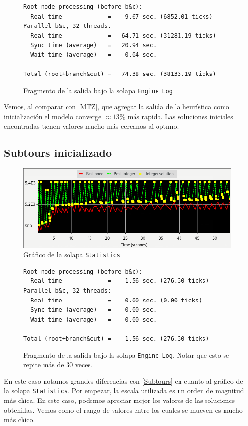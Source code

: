 \documentclass[titlepage,a4paper,oneside]{article}
\begin{document}
\begin{figure}[H]
\begin{verbatim}
Root node processing (before b&c):
  Real time             =    9.67 sec. (6852.01 ticks)
Parallel b&c, 32 threads:
  Real time             =   64.71 sec. (31281.19 ticks)
  Sync time (average)   =   20.94 sec.
  Wait time (average)   =    0.04 sec.
                          ------------
Total (root+branch&cut) =   74.38 sec. (38133.19 ticks)
\end{verbatim}
\caption{Fragmento de la salida bajo la solapa \texttt{Engine Log}}
\end{figure}

Vemos, al comparar con \ref{MTZ}, que agregar la salida de la heurística como inicialización el modelo converge $\approx 13\%$ más rapido. Las soluciones iniciales encontradas tienen valores mucho más cercanos al óptimo.

\subsection{Subtours inicializado}
\begin{figure}[H]
\centering
\includegraphics[width=\textwidth]{images/subtours_init.png}
\caption{Gráfico de la solapa \texttt{Statistics}}
\end{figure}

\begin{figure}[H]
\begin{verbatim}
Root node processing (before b&c):
  Real time             =    1.56 sec. (276.30 ticks)
Parallel b&c, 32 threads:
  Real time             =    0.00 sec. (0.00 ticks)
  Sync time (average)   =    0.00 sec.
  Wait time (average)   =    0.00 sec.
                          ------------
Total (root+branch&cut) =    1.56 sec. (276.30 ticks)
\end{verbatim}
\caption{Fragmento de la salida bajo la solapa \texttt{Engine Log}. Notar que esto se repite más de 30 veces.}
\end{figure}

En este caso notamos grandes diferencias con \ref{Subtours} en cuanto al gráfico de la solapa \texttt{Statistics}. Por empezar, la escala utilizada es un orden de magnitud más chica. En este caso, podemos apreciar mejor los valores de las soluciones obtenidas. Vemos como el rango de valores entre los cuales se mueven es mucho más chico.

\printbibliography
\end{document}
